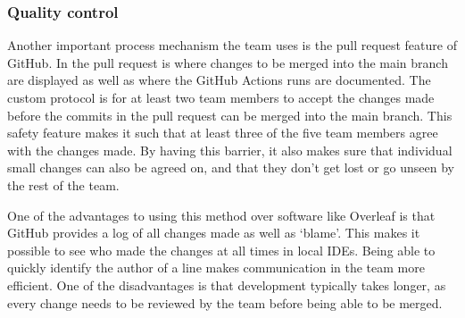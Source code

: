 
\subsubsection{Quality control}

Another important process mechanism the team uses is the pull request feature of GitHub.
In the pull request is where changes to be merged into the main branch are displayed as well as where the GitHub Actions
runs are documented.
The custom protocol is for at least two team members to accept the changes made before the commits in the pull request
can be merged into the main branch.
This safety feature makes it such that at least three of the five team members agree with the changes made.
By having this barrier, it also makes sure that individual small changes can also be agreed on, and that they don't get
lost or go unseen by the rest of the team.

One of the advantages to using this method over software like Overleaf is that GitHub provides a log of all changes made
as well as `blame'.
This makes it possible to see who made the changes at all times in local IDEs.
Being able to quickly identify the author of a line makes communication in the team more efficient.
One of the disadvantages is that development typically takes longer, as every change needs to be reviewed by the team
before being able to be merged.
